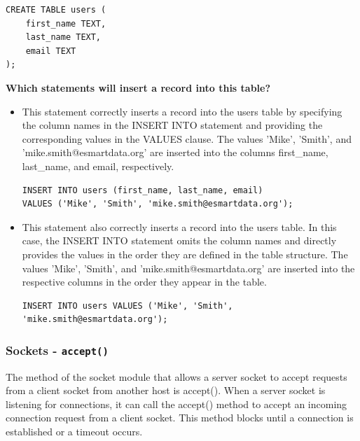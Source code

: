 \begin{codebox}
\begin{verbatim}
CREATE TABLE users (
    first_name TEXT,
    last_name TEXT,
    email TEXT
);
\end{verbatim}
\end{codebox}

\textbf{Which statements will insert a record into this table?}

\begin{itemize}
\item This statement correctly inserts a record into the users table by specifying the column names in the INSERT INTO statement and providing the corresponding values in the VALUES clause. The values 'Mike', 'Smith', and 'mike.smith@esmartdata.org' are inserted into the columns first\_name, last\_name, and email, respectively.
\begin{codebox}
\begin{verbatim}
INSERT INTO users (first_name, last_name, email)
VALUES ('Mike', 'Smith', 'mike.smith@esmartdata.org');
\end{verbatim}
\end{codebox}

\item This statement also correctly inserts a record into the users table. In this case, the INSERT INTO statement omits the column names and directly provides the values in the order they are defined in the table structure. The values 'Mike', 'Smith', and 'mike.smith@esmartdata.org' are inserted into the respective columns in the order they appear in the table.
\begin{codebox}
\begin{verbatim}
INSERT INTO users VALUES ('Mike', 'Smith', 'mike.smith@esmartdata.org');
\end{verbatim}
\end{codebox}
\end{itemize}

\newpage
\subsubsection{Sockets - \texttt{accept()}}

The method of the socket module that allows a server socket to accept requests from a client socket from another host is accept(). When a server socket is listening for connections, it can call the accept() method to accept an incoming connection request from a client socket. This method blocks until a connection is established or a timeout occurs.

